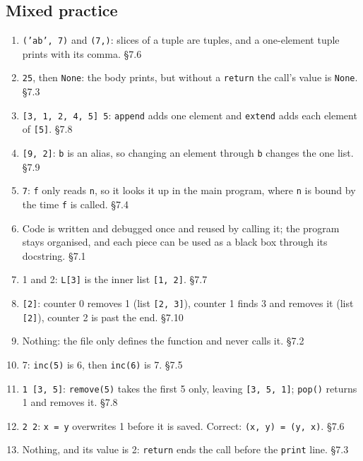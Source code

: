\documentclass[11pt]{article}
\begin{document}
\begin{keepsection}\subsection{Mixed practice}

\begin{enumerate}
\item \texttt{('ab', 7)} and \texttt{(7,)}: slices of a tuple are tuples, and a one-element tuple prints with its comma. \hfill{\small\color{FAUblue}§7.6}
\item \texttt{25}, then \texttt{None}: the body prints, but without a \texttt{return} the call’s value is \texttt{None}. \hfill{\small\color{FAUblue}§7.3}
\item \texttt{[3, 1, 2, 4, 5] 5}: \texttt{append} adds one element and \texttt{extend} adds each element of \texttt{[5]}. \hfill{\small\color{FAUblue}§7.8}
\item \texttt{[9, 2]}: \texttt{b} is an alias, so changing an element through \texttt{b} changes the one list. \hfill{\small\color{FAUblue}§7.9}
\item \texttt{7}: \texttt{f} only reads \texttt{n}, so it looks it up in the main program, where \texttt{n} is bound by the time \texttt{f} is called. \hfill{\small\color{FAUblue}§7.4}
\item Code is written and debugged once and reused by calling it; the program stays organised, and each piece can be used as a black box through its docstring. \hfill{\small\color{FAUblue}§7.1}
\item 1 and 2: \texttt{L[3]} is the inner list \texttt{[1, 2]}. \hfill{\small\color{FAUblue}§7.7}
\item \texttt{[2]}: counter 0 removes 1 (list \texttt{[2, 3]}), counter 1 finds 3 and removes it (list \texttt{[2]}), counter 2 is past the end. \hfill{\small\color{FAUblue}§7.10}
\item Nothing: the file only defines the function and never calls it. \hfill{\small\color{FAUblue}§7.2}
\item 7: \texttt{inc(5)} is 6, then \texttt{inc(6)} is 7. \hfill{\small\color{FAUblue}§7.5}
\item \texttt{1 [3, 5]}: \texttt{remove(5)} takes the first 5 only, leaving \texttt{[3, 5, 1]}; \texttt{pop()} returns 1 and removes it. \hfill{\small\color{FAUblue}§7.8}
\item \texttt{2 2}: \texttt{x = y} overwrites 1 before it is saved. Correct: \texttt{(x, y) = (y, x)}. \hfill{\small\color{FAUblue}§7.6}
\item Nothing, and its value is 2: \texttt{return} ends the call before the \texttt{print} line. \hfill{\small\color{FAUblue}§7.3}

\end{enumerate}
\end{keepsection}
\end{document}
